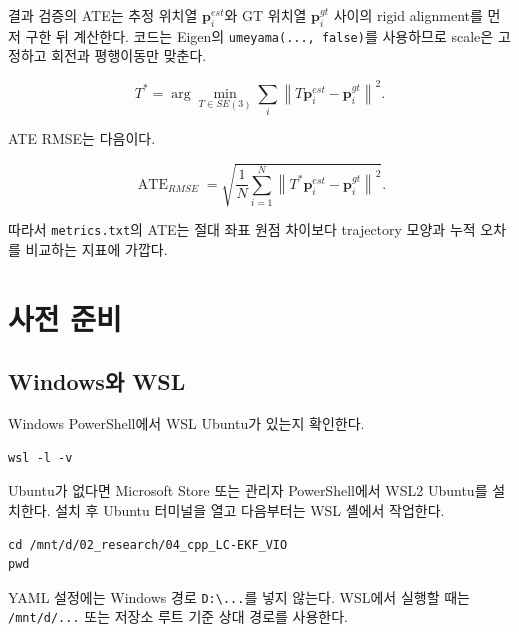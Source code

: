 \documentclass[11pt,a4paper,oneside]{report}
\begin{document}
결과 검증의 ATE는 추정 위치열 \(\mathbf{p}^{est}_i\)와 GT 위치열
\(\mathbf{p}^{gt}_i\) 사이의 rigid alignment를 먼저 구한 뒤 계산한다.
코드는 Eigen의 \texttt{umeyama(..., false)}를 사용하므로 scale은 고정하고
회전과 평행이동만 맞춘다.

\begin{equation}
T^{*}
= \arg\min_{T\in SE(3)}
\sum_{i}
\left\|
T\mathbf{p}^{est}_i - \mathbf{p}^{gt}_i
\right\|^{2}.
\end{equation}

ATE RMSE는 다음이다.

\begin{equation}
\operatorname{ATE}_{RMSE}
=
\sqrt{
\frac{1}{N}
\sum_{i=1}^{N}
\left\|
T^{*}\mathbf{p}^{est}_i - \mathbf{p}^{gt}_i
\right\|^{2}
}.
\end{equation}

따라서 \texttt{metrics.txt}의 ATE는 절대 좌표 원점 차이보다 trajectory 모양과 누적 오차를
비교하는 지표에 가깝다.

\chapter{사전 준비}

\section{Windows와 WSL}

Windows PowerShell에서 WSL Ubuntu가 있는지 확인한다.

\begin{lstlisting}[style=shell,caption={PowerShell에서 WSL 확인}]
wsl -l -v
\end{lstlisting}

Ubuntu가 없다면 Microsoft Store 또는 관리자 PowerShell에서 WSL2 Ubuntu를 설치한다.
설치 후 Ubuntu 터미널을 열고 다음부터는 WSL 셸에서 작업한다.

\begin{lstlisting}[style=shell,caption={WSL에서 저장소 위치로 이동}]
cd /mnt/d/02_research/04_cpp_LC-EKF_VIO
pwd
\end{lstlisting}

\begin{warnbox}
YAML 설정에는 Windows 경로 \texttt{D:\textbackslash ...}를 넣지 않는다. WSL에서 실행할 때는
\texttt{/mnt/d/...} 또는 저장소 루트 기준 상대 경로를 사용한다.
\end{warnbox}
\end{document}
